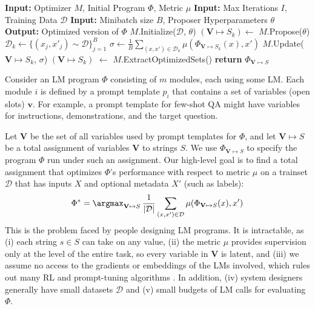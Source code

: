 \label{sec:problem-statement}

\begin{algorithm}
\caption{Optimize $\Phi$ with optimizer $M$} %
\small
\begin{algorithmic}[1]
  \State \textbf{Input:}
  Optimizer $M$,
  Initial Program $\Phi$,
  Metric $\mu$
  \State \textbf{Input:} Max Iterations $I$,
  Training Data $\mathcal{D}$
  \State \textbf{Input:} Minibatch size $B$,
  Proposer Hyperparameters $\theta$
\State \textbf{Output:} Optimized version of $\Phi$
\State
\State %
$M$.Initialize($\mathcal{D}$, $\theta$) 
    \State $(\mathbf{V} \mapsto S_{k}) \gets$ $M$.Propose($\theta$) 
    \State $\mathcal{D}_{k} \gets \{(x_j,x'_j) \sim \mathcal{D}\}_{j=1}^B$  
    \State $\sigma \gets \frac{1}{B}\sum_{(x, x') \in \mathcal{D}_{k}}\mu(\Phi_{\mathbf{V} \mapsto S_{k}}(x), x')$ 
    \State %
    $M$.Update($\mathbf{V} \mapsto S_{k}$, $\sigma$) 
\EndFor
\State $(\mathbf{V} \mapsto S_{k})$ $\gets$ $M$.ExtractOptimizedSets()
\State \textbf{return} $\Phi_{\mathbf{V} \mapsto S}$
\end{algorithmic}
\label{alg:general}
\end{algorithm}

Consider an LM program $\Phi$ consisting of $m$ modules, each using some LM. Each module $i$ is defined by a prompt template $p_{i}$ that contains a set of variables (open slots) $\mathbf{v}$. For example, a prompt template for few-shot QA might have variables for instructions, demonstrations, and the target question. 

Let $\mathbf{V}$ be the set of all variables used by prompt templates for $\Phi$, and 
let $\mathbf{V} \mapsto S$ be a total assignment of variables $\mathbf{V}$ to strings $S$. We use $\Phi_{\mathbf{V} \mapsto S}$ to specify the program $\Phi$ run under such an assignment. Our high-level goal is to find a total assignment that optimizes $\Phi$'s performance 
with respect to metric $\mu$ on a trainset $\mathcal{D}$ that has inputs $X$ and optional metadata $X'$ (such as labels):
\begin{equation*}
  \Phi^* =
  \argmax_{\mathbf{V} \mapsto S}
  \, \frac{1}{|\mathcal{D}|} \sum_{(x, x') \in \mathcal{D}}
  \mu(\Phi_{\mathbf{V} \mapsto S}(x), x')
  \label{eq:prompt_components_new}
\end{equation*}
This is the problem faced by people designing LM programs. It is intractable, as (i) each string $s \in S$ can take on any value, (ii) the metric $\mu$ provides supervision only at the level of the entire task, so every variable in $\mathbf{V}$ is latent, and (iii) we assume no access to the gradients or embeddings of the LMs involved, which rules out many RL and prompt-tuning algorithms \citep{zhang2022tempera, li-liang-2021-prefix, shin-etal-2020-autoprompt}. In addition, (iv) system designers generally have small datasets $\mathcal{D}$ and (v) small budgets of LM calls for evaluating $\Phi$.

